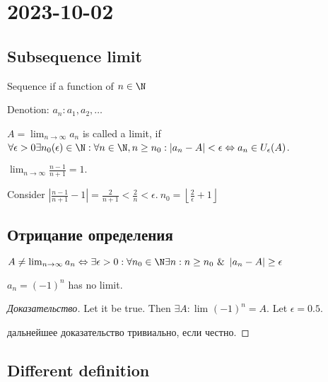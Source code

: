 \section{2023-10-02}

\subsection{Subsequence limit}

\begin{definition}[]
	Sequence if a function of $n \in \N$
	
	Denotion: $a_{n}: a_1, a_2, \dots $
\end{definition}

\begin{definition}
	$A = \lim_{n \to \infty} a_n$ is called a limit, if $\\\forall \epsilon > 0 \exists n_0(\epsilon) \in \N: \forall n \in \N, n \geq n_0: \left| a_n - A \right|  <\epsilon \Leftrightarrow a_n \in U_\epsilon (A)$.
\end{definition}

\begin{example}[]
	$\lim_{n \to \infty} \frac{n-1}{n+1} = 1.$

	Consider $\left| \frac{n-1}{n+1} - 1 \right| = \frac{2}{n+1} < \frac{2}{n} < \epsilon. \ n_0 = \left\lfloor \frac{2}{\epsilon} + 1 \right\rfloor$
\end{example}

\subsection{Отрицание определения}

\begin{definition}[]
	$A \neq \lim_{n \to \infty} a_n \Leftrightarrow \exists \epsilon > 0: \forall n_0 \in \N \exists n: n \geq n_0 \ \& \ \left| a_n - A \right| \geq \epsilon$
\end{definition}

\begin{example}[]
	$a_n = (-1)^{n}$ has no limit.
\end{example}
\begin{proof}[Доказательство]
	Let it be true. Then $\exists A: \lim_{} (-1)^{n} = A$. Let $\epsilon = 0.5$.  

	дальнейшее доказательство тривиально, если честно.
\end{proof}

\subsection{Different definition}

